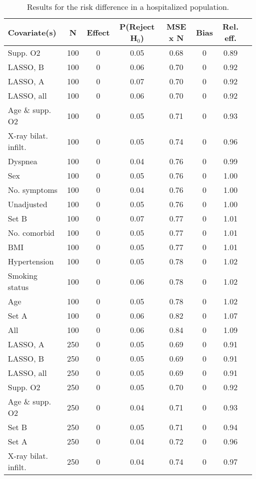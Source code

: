 \documentclass{article}
\begin{document}
{\tabcolsep=6pt  %
\begin{longtable}{lccccccc}
\caption{Results for the risk difference in a hospitalized population.}\label{tab4}\\
Covariate(s) & N & Effect & P(Reject H$_0$) & MSE x N & Bias & Rel. eff.\\ \midrule
Supp. O2 & 100 & 0 & 0.05 & 0.68 & 0 & 0.89\\
LASSO, B & 100 & 0 & 0.06 & 0.70 & 0 & 0.92\\
LASSO, A & 100 & 0 & 0.07 & 0.70 & 0 & 0.92\\
LASSO, all & 100 & 0 & 0.06 & 0.70 & 0 & 0.92\\
Age \& supp. O2 & 100 & 0 & 0.05 & 0.71 & 0 & 0.93\\
X-ray bilat. infilt. & 100 & 0 & 0.05 & 0.74 & 0 & 0.96\\
Dyspnea & 100 & 0 & 0.04 & 0.76 & 0 & 0.99\\
Sex & 100 & 0 & 0.05 & 0.76 & 0 & 1.00\\
No. symptoms & 100 & 0 & 0.04 & 0.76 & 0 & 1.00\\
Unadjusted & 100 & 0 & 0.05 & 0.76 & 0 & 1.00\\
Set B & 100 & 0 & 0.07 & 0.77 & 0 & 1.01\\
No. comorbid & 100 & 0 & 0.05 & 0.77 & 0 & 1.01\\
BMI & 100 & 0 & 0.05 & 0.77 & 0 & 1.01\\
Hypertension & 100 & 0 & 0.05 & 0.78 & 0 & 1.02\\
Smoking status & 100 & 0 & 0.06 & 0.78 & 0 & 1.02\\
Age & 100 & 0 & 0.05 & 0.78 & 0 & 1.02\\
Set A & 100 & 0 & 0.06 & 0.82 & 0 & 1.07\\
All & 100 & 0 & 0.06 & 0.84 & 0 & 1.09\\ \midrule
LASSO, A & 250 & 0 & 0.05 & 0.69 & 0 & 0.91\\
LASSO, B & 250 & 0 & 0.05 & 0.69 & 0 & 0.91\\
LASSO, all & 250 & 0 & 0.05 & 0.69 & 0 & 0.91\\
Supp. O2 & 250 & 0 & 0.05 & 0.70 & 0 & 0.92\\
Age \& supp. O2 & 250 & 0 & 0.04 & 0.71 & 0 & 0.93\\
Set B & 250 & 0 & 0.05 & 0.71 & 0 & 0.94\\
Set A & 250 & 0 & 0.04 & 0.72 & 0 & 0.96\\
X-ray bilat. infilt. & 250 & 0 & 0.04 & 0.74 & 0 & 0.97\\

\end{longtable}}
\end{document}
